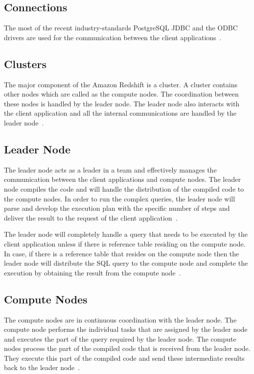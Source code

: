 	\subsection{Connections}
	 The most of the recent industry-standards PostgreSQL JDBC and the 
	 ODBC drivers are used for the communication between the client 
	 applications~\cite{hid-sp18-412-Amazon_Redshift_architecture}.
    
	\subsection{Clusters}
	 The major component of the Amazon Redshift is a cluster. 
	 A cluster contains other nodes which are called as the compute nodes. 
	 The coordination between these nodes is handled by the leader node. 
	 The leader node also interacts with the client application and all the 
	 internal communications are handled 
	 by the leader node~\cite{hid-sp18-412-Amazon_Redshift_architecture}. 
    
	\subsection{Leader Node}
	 The leader node acts as a leader in a team and effectively manages 
	 the communication between the client applications and compute nodes. 
	 The leader node compiles the code and will handle the distribution of 
	 the compiled code to the compute nodes. In order to run the complex 
	 queries, the leader node will parse and develop the execution plan 
	 with the specific number of steps and deliver the result to the 
	 request of the 
	 client application~\cite{hid-sp18-412-Amazon_Redshift_architecture}.
        
	The leader node will completely handle a query that needs to be 
	executed by the client application unless if there is reference 
	table residing on the compute node. In case, if there is a reference 
	table that resides on the compute node then the leader node will 
	distribute the SQL query to the compute node and complete the 
	execution by obtaining the result from the compute 
	node~\cite{hid-sp18-412-Amazon_Redshift_architecture}.
		
	\subsection{Compute Nodes}
	The compute nodes are in continuous coordination with the leader node. 
	The compute node performs the individual tasks that are assigned by the 
	leader node and executes the part of the query required by the leader 
	node. The compute nodes process the part of the compiled code that 
	is received from the leader node. They execute this part of the 
	compiled code and send these intermediate results 
	back to the 
	leader node~\cite{hid-sp18-412-Amazon_Redshift_architecture}.

